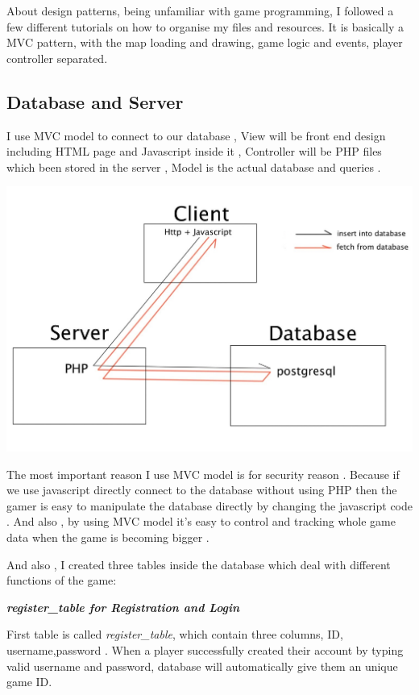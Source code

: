 \documentclass[a4wide, 11pt]{article}
\begin{document}
About design patterns, being unfamiliar with game programming, I followed a few different tutorials on how to organise my files and resources. It is basically a MVC pattern, with the map loading and drawing, game logic and events, player controller separated.

\subsection{Database and Server}

I use MVC model to connect to our database , View will be front end design including HTML page and Javascript inside it , Controller will be PHP files which been stored in the server , Model is the actual database and queries . 

\includegraphics[width=\linewidth]{comm}


The most important reason I use MVC model is for security reason . Because if we use javascript directly connect to the database without using PHP then the gamer is easy to manipulate the database directly by changing the javascript code . And also , by using MVC model it’s easy to control and tracking whole game data when the game is becoming bigger .

And also , I created three tables inside the database which deal with different functions of the game:

\textit{\textbf{register\_table for Registration and Login}}

First table is called \textit{register\_table}, which contain three columns, ID, username,password . When a player successfully created their account by typing valid username and password, database will automatically give them an unique game ID.
\end{document}
